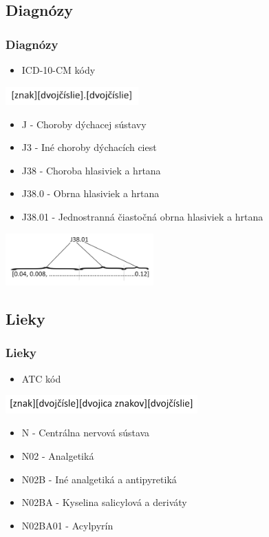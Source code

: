 \documentclass[slovak]{beamer}
\begin{document}
\subsection{Diagnózy}

\begin{frame}
	\frametitle{Diagnózy}
	\begin{itemize}
		\item<1> ICD-10-CM kódy
	\end{itemize}

	\begin{center}
		\includegraphics[height=0.7cm]{images/ICD_code.png}
	\end{center}
	\begin{itemize}
		\item<1> J - Choroby dýchacej sústavy
		\item<1> J3 - Iné choroby dýchacích ciest 
		\item<1> J38 - Choroba hlasiviek a hrtana
		\item<1> J38.0 - Obrna hlasiviek a hrtana
		\item<1> J38.01 - Jednostranná čiastočná obrna hlasiviek a hrtana
	\end{itemize}

	\begin{center}
		\includegraphics[height=2cm]{images/ICD_code_emb.png}
	\end{center}
\end{frame}

\subsection{Lieky}

\begin{frame}
	\frametitle{Lieky}
	\begin{itemize}
		\item<1> ATC kód
	\end{itemize}
	\begin{center}
		\includegraphics[height=0.7cm]{images/ATC_code.png}
	\end{center}
	\begin{itemize}
		\item<1> N - Centrálna nervová sústava
		\item<1> N02 - Analgetiká
		\item<1> N02B - Iné analgetiká a antipyretiká
		\item<1> N02BA - Kyselina salicylová a deriváty
		\item<1> N02BA01 - Acylpyrín
	\end{itemize}
	
\end{frame}
\end{document}
